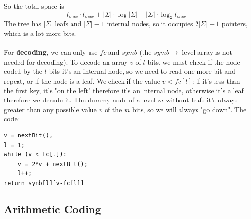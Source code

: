 \documentclass[10pt]{report}
\begin{document}
So the total space is $$l_{max}\cdot l_{max} + |\Sigma|\cdot\log|\Sigma| + |\Sigma|\cdot\log_2 l_{max}$$
The tree has $|\Sigma|$ leafs and $|\Sigma|-1$ internal nodes, so it occupies $2|\Sigma|-1$ pointers, which is a lot more bits.\\\\
For \textbf{decoding}, we can only use $fc$ and $symb$ (the $symb\rightarrow$ level array is not needed for decoding). To decode an array $v$ of $l$ bits, we must check if the node coded by the $l$ bits it's an internal node, so we need to read one more bit and repeat, or if the node is a leaf. We check if the value $v < fc[l]$: if it's less than the first key, it's "on the left" therefore it's an internal node, otherwise it's a leaf therefore we decode it. The dummy node of a level $m$ without leafs it's always greater than any possible value $v$ of the $m$ bits, so we will always "go down". The code:
\begin{lstlisting}[style=myPython]
v = nextBit();
l = 1;
while (v < fc[l]):
	v = 2*v + nextBit();
	l++;
return symb[l][v-fc[l]]
\end{lstlisting}
\subsection{Arithmetic Coding}
\end{document}
